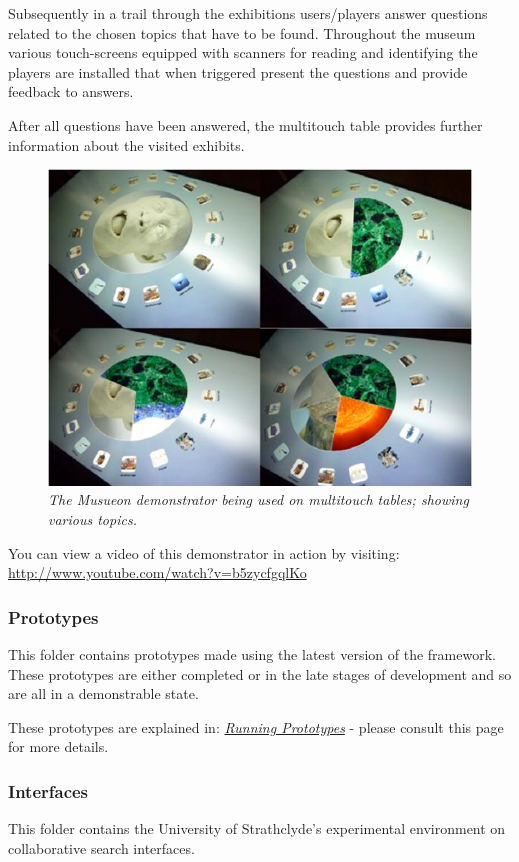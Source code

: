 \documentclass[letterpaper,10pt,english]{sphinxmanual}
\begin{document}
Subsequently in a trail through the exhibitions users/players answer questions related to the chosen topics that have to be found. Throughout the museum various touch-screens equipped with scanners for reading and identifying the players are installed that when
triggered present the questions and provide feedback to answers.

After all questions have been answered, the multitouch table provides further information about the visited exhibits.
\begin{figure}[htbp]
\centering
\capstart

\includegraphics{puppy-musueon.png}
\caption{\emph{The Musueon demonstrator being used on multitouch tables; showing various topics.}}\end{figure}

You can view a video of this demonstrator in action by visiting: \href{http://www.youtube.com/watch?v=b5zycfgqlKo}{http://www.youtube.com/watch?v=b5zycfgqlKo}


\subsubsection{Prototypes}
\label{repo:prototypes}
This folder contains prototypes made using the latest version of the framework. These prototypes are either completed or in the late stages of development and so are all in a demonstrable state.

These prototypes are explained in: {\hyperref[prototypes:prototypes]{\emph{Running Prototypes}}} - please consult this page for more details.


\subsubsection{Interfaces}
\label{repo:interfaces}
This folder contains the University of Strathclyde's experimental environment on collaborative search interfaces.
\end{document}
